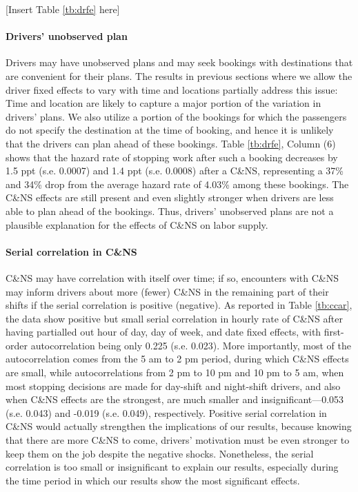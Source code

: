 \documentclass[reviewmode]{restat}
\begin{document}
\begin{center}
    [Insert Table \ref{tb:drfe} here]
\end{center}

\paragraph{Drivers' unobserved plan} Drivers may have unobserved plans and may seek bookings with destinations 
that are convenient for their plans. The results in previous sections where we allow the driver fixed effects
to vary with time and locations partially address this issue: Time and location are likely to capture a major
portion of the variation in drivers' plans. We also utilize a portion of the bookings for which the passengers 
do not specify the destination at the time of booking, and hence it is unlikely that the drivers can plan ahead
of these bookings. Table \ref{tb:drfe}, Column (6) shows that the hazard rate of stopping work after such a 
booking decreases by 1.5 ppt (s.e. 0.0007) and 1.4 ppt (s.e. 0.0008) after a C\&NS, representing a 37\% and
34\% drop from the average hazard rate of 4.03\% among these bookings. The C\&NS effects are still present 
and even slightly stronger when drivers are less able to plan ahead of the bookings. Thus, drivers' unobserved
plans are not a plausible explanation for the effects of C\&NS on labor supply.


\paragraph{Serial correlation in C\&NS} C\&NS may have correlation with itself over time; if so, encounters
with C\&NS may inform drivers about more (fewer) C\&NS in the remaining part of their shifts if the serial 
correlation is positive (negative). As reported in Table \ref{tb:ccar}, the data show positive but small 
serial correlation in hourly rate of C\&NS after having partialled out hour of day, day of week, and date 
fixed effects, with first-order autocorrelation being only 0.225 (s.e. 0.023). More importantly, most of 
the autocorrelation comes from the 5 am to 2 pm period, during which C\&NS effects are small, while 
autocorrelations from 2 pm to 10 pm and 10 pm to 5 am, when most stopping decisions are made for day-shift
and night-shift drivers, and also when C\&NS effects are the strongest, are much smaller and insignificant---0.053
(s.e. 0.043) and -0.019 (s.e. 0.049), respectively. Positive serial correlation in C\&NS would actually strengthen
the implications of our results, because knowing that there are more C\&NS to come, drivers' motivation must 
be even stronger to keep them on the job despite the negative shocks. Nonetheless, the serial correlation is
too small or insignificant to explain our results, especially during the time period in which our results 
show the most significant effects.
\end{document}
